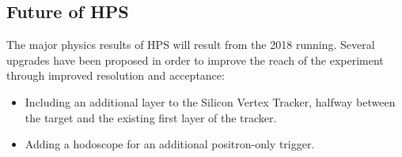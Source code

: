 \documentclass[b1]{sciposter}
\begin{document}
\begin{multicols}{3}
        \section*{Future of HPS}
%

        The major physics results of HPS will result from the 2018 running. %
        Several upgrades have been proposed in order to improve the reach of the experiment through improved resolution and acceptance:  
     	\begin{itemize}
	\item Including an additional layer to the Silicon Vertex Tracker, halfway between the target and the existing first layer of the tracker.  
	\item Adding a hodoscope for an additional positron-only trigger.  
	\end{itemize}
	
\end{multicols}
\end{document}
